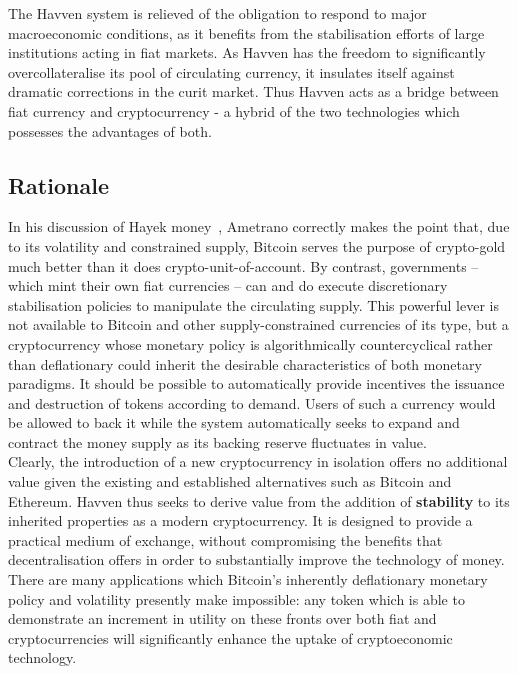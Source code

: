 \noindent The Havven system is relieved of the obligation to respond to major macroeconomic conditions, 
as it benefits from the stabilisation efforts of large institutions acting in fiat markets.
As Havven has the freedom to significantly overcollateralise its pool of circulating currency, it
insulates itself against dramatic corrections in the curit market.
Thus Havven acts as a bridge between fiat currency and cryptocurrency - a hybrid of the two technologies which possesses
the advantages of both. \\

\subsection{Rationale}

\noindent  In his discussion of Hayek money~\cite{ametrano2016hayek}, Ametrano correctly makes the point that,
due to its volatility and constrained supply, Bitcoin serves the purpose of crypto-gold much better than it
does crypto-unit-of-account. By contrast, governments -- which mint their own fiat currencies -- can and do execute
discretionary stabilisation policies to manipulate the circulating supply. This powerful lever is not
available to Bitcoin and other supply-constrained currencies of its type, but a cryptocurrency whose monetary
policy is algorithmically countercyclical rather than deflationary could inherit the desirable characteristics
of both monetary paradigms. It should be possible to automatically provide incentives the issuance and
destruction of tokens according to demand. Users of such a currency would be allowed to back it while
the system automatically seeks to expand and contract the money supply as its backing
reserve fluctuates in value. \\

\noindent Clearly, the introduction of a new cryptocurrency in isolation offers no additional value given
the existing and established alternatives such as Bitcoin and Ethereum. Havven thus seeks to derive value
from the addition of \textbf{stability} to its inherited properties as a modern cryptocurrency.
It is designed to provide a practical medium of exchange, without compromising the benefits that
decentralisation offers in order to substantially improve the technology of money.
There are many applications which Bitcoin's inherently deflationary monetary policy and
volatility presently make impossible: any token which is able to demonstrate an increment
in utility on these fronts over both fiat and cryptocurrencies will significantly
enhance the uptake of cryptoeconomic technology.

\pagebreak
